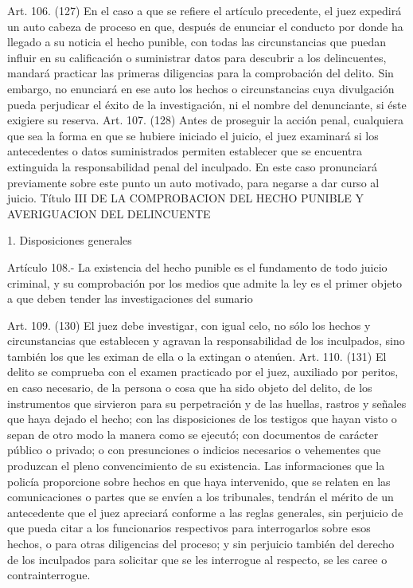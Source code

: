     Art. 106. (127) En el caso a que se refiere el artículo precedente, el juez expedirá un auto cabeza de proceso en que, después de enunciar el conducto por donde ha llegado a su noticia el hecho punible, con todas las circunstancias que puedan influir en su calificación o suministrar datos para descubrir a los delincuentes, mandará practicar las primeras diligencias para la comprobación del delito.
    Sin embargo, no enunciará en ese auto los hechos o circunstancias cuya divulgación pueda perjudicar el éxito de la investigación, ni el nombre del denunciante, si éste exigiere su reserva.
    Art. 107. (128) Antes de proseguir la acción penal, cualquiera que sea la forma en que se hubiere iniciado el juicio, el juez examinará si los antecedentes o datos suministrados permiten establecer que se encuentra extinguida la responsabilidad penal del inculpado. En este caso pronunciará previamente sobre este punto un auto motivado, para negarse a dar curso al juicio.
  Título III
  DE LA COMPROBACION DEL HECHO PUNIBLE Y AVERIGUACION
DEL DELINCUENTE

    1. Disposiciones generales

    Artículo 108.- La existencia del hecho punible es el fundamento de todo juicio criminal, y su comprobación por los medios que admite la ley es el primer objeto a que deben tender las investigaciones del sumario

    Art. 109. (130) El juez debe investigar, con igual celo, no sólo los hechos y circunstancias que establecen y agravan la responsabilidad de los inculpados, sino también los que les eximan de ella o la extingan o atenúen.
    Art. 110. (131) El delito se comprueba con el examen practicado por el juez, auxiliado por peritos, en caso necesario, de la persona o cosa que ha sido objeto del delito, de los instrumentos que sirvieron para su perpetración y de las huellas, rastros y señales que haya dejado el hecho; con las disposiciones de los testigos que hayan visto o sepan de otro modo la manera como se ejecutó; con documentos de carácter público o privado; o con presunciones o indicios necesarios o vehementes que produzcan el pleno convencimiento de su existencia.
    Las informaciones que la policía proporcione sobre hechos en que haya intervenido, que se relaten en las comunicaciones o partes que se envíen a los tribunales, tendrán el mérito de un antecedente que el juez apreciará conforme a las reglas generales, sin perjuicio de que pueda citar a los funcionarios respectivos para interrogarlos sobre esos hechos, o para otras diligencias del proceso; y sin perjuicio también del derecho de los inculpados para solicitar que se les interrogue al respecto, se les caree o contrainterrogue.

